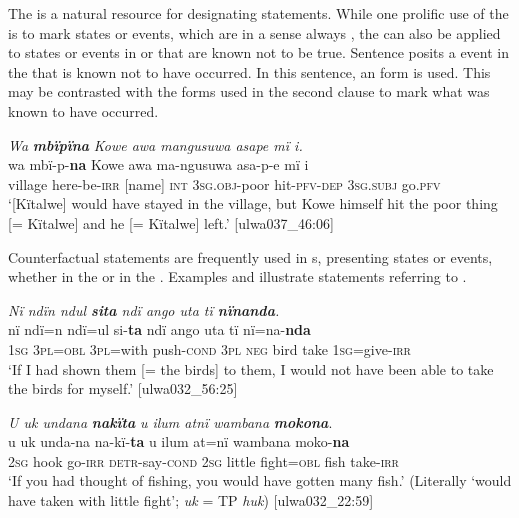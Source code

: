   The   is a natural resource for designating  statements. While one prolific use of the   is to mark  states or events, which are in a sense always , the   can also be applied to  states or events in  or   that are known not to be true. Sentence  posits a  event in the  that is known not to have occurred. In this sentence, an  form is used. This may be contrasted with the  forms used in the second clause to mark what was known to have occurred.

\ea%
    \label{ex:syntax:267}
          \textit{Wa} \textbf{\textit{mbïpïna}} \textit{Kowe awa mangusuwa asape mï i.}\\
\gll    wa    mbï-p-\textbf{na}    Kowe  awa  ma-ngusuwa    asa-p-e     mï      i\\
    village  here-be-\textsc{irr}  [name]  \textsc{int}    3\textsc{sg.obj-}poor    hit-\textsc{pfv-dep}    3\textsc{sg.subj}  go.\textsc{pfv}\\
\glt    ‘[Kïtalwe] would have stayed in the village, but Kowe himself hit the poor thing   [= Kïtalwe] and he [= Kïtalwe] left.’ [ulwa037\_46:06]
\z

Counterfactual statements are frequently used in s, presenting  states or events, whether in the  or in the . Examples  and  illustrate   statements referring to  .

\ea%
    \label{ex:syntax:268}
          \textit{Nï ndïn ndul \textbf{sita} ndï ango uta tï \textbf{nïnanda}.}\\
\gll nï    ndï=n    ndï=ul    si-\textbf{ta}      ndï  ango  uta    tï nï=na-\textbf{nda}\\
    1\textsc{sg}  3\textsc{pl=obl}  3\textsc{pl}=with  push\textsc{{}-cond}  \textsc{3pl}  \textsc{neg} bird  take    1\textsc{sg}=give-\textsc{irr}\\
\glt    ‘If I had shown them [= the birds] to them, I would not have been able to take the birds for myself.’ [ulwa032\_56:25]
\z

\ea%
    \label{ex:syntax:269}
          \textit{U uk undana} \textbf{\textit{nakïta}} \textit{u ilum atnï wambana} \textbf{\textit{mokona}}.\\
\gll u    uk    unda-na  na-kï-\textbf{ta}      u     ilum at=nï    wambana  moko-\textbf{na}\\
    2\textsc{sg}  hook  go-\textsc{irr}    \textsc{detr-}say\textsc{{}-cond}  \textsc{2sg} little    fight=\textsc{obl}  fish    take-\textsc{irr}\\
\glt `If you had thought of fishing, you would have gotten many fish.’ (Literally ‘would have taken with little fight’; \textit{uk} = TP \textit{huk}) [ulwa032\_22:59]
\z

